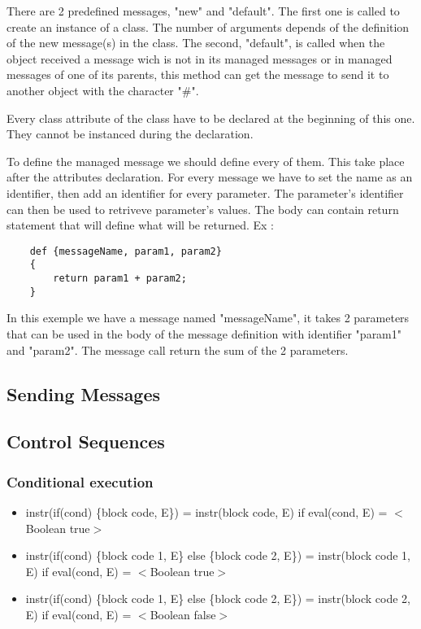 \documentclass{eplDoc}
\begin{document}
There are 2 predefined messages, "new" and "default".  The first one is called 
to create an instance of a class.  The number of arguments depends of the 
definition of the new message(s) in the class.  The second, "default", is called
when the object received a message wich is not in its managed messages or in 
managed messages of one of its parents, this method can get the message to send 
it to another object with the character "\#". 


Every class attribute of the class have to be declared at the beginning of this one.  
They cannot be instanced during the declaration.

To define the managed message we should define every of them.  This take place after the attributes declaration.  For every message we have to set the name as an identifier, then add an identifier for every parameter. The parameter's identifier can then be used to retriveve parameter's values. 
The body can contain return statement that will define what will be returned.
Ex : 
\begin{lstlisting}
    def {messageName, param1, param2}
    {
        return param1 + param2;
    }
\end{lstlisting}
In this exemple we have a message named "messageName", it takes 2 parameters that can be used in the body of the message definition with identifier "param1" and "param2".  The message call return the sum of the 2 parameters.


\subsection{Sending Messages}

\subsection{Control Sequences} 
\subsubsection{Conditional execution}
\begin{itemize}
	\item instr(if(cond) \{block code, E\}) = instr(block code, E) if eval(cond, E) = $<$Boolean true$>$
	\item instr(if(cond) \{block code 1, E\} else \{block code 2, E\}) = instr(block code 1, E) if eval(cond, E) = $<$Boolean true$>$  
  \item instr(if(cond) \{block code 1, E\} else \{block code 2, E\}) = instr(block code 2, E) if eval(cond, E) = $<$Boolean false$>$           
                       
\end{itemize}
\end{document}
